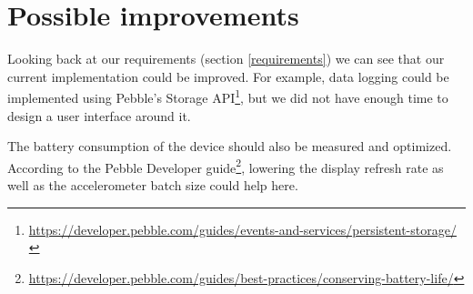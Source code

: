 \documentclass[12pt,twoside,a4paper]{article}
\begin{document}
\section{Possible improvements}

Looking back at our requirements (section \ref{requirements}) we can see that our current implementation could be improved.
For example, data logging could be implemented using Pebble's Storage API\footnote{\url{https://developer.pebble.com/guides/events-and-services/persistent-storage/}}, but we did not have enough time to design a user interface around it.

The battery consumption of the device should also be measured and optimized.
According to the Pebble Developer guide\footnote{\url{https://developer.pebble.com/guides/best-practices/conserving-battery-life/}}, lowering the display refresh rate as well as the accelerometer batch size could help here.
\end{document}
